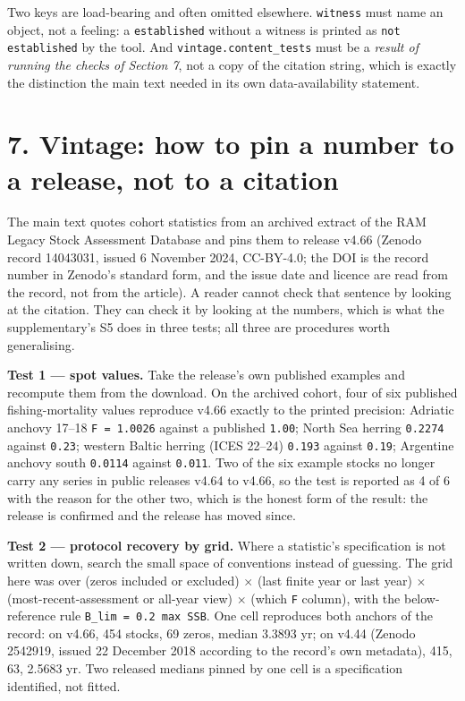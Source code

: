 \documentclass[11pt]{article}
\begin{document}
Two keys are load-bearing and often omitted elsewhere. \texttt{witness} must name an object, not a feeling: a \texttt{established} without a witness is printed as \texttt{not established} by the tool. And \texttt{vintage.content\_tests} must be a \emph{result of running the checks of Section 7}, not a copy of the citation string, which is exactly the distinction the main text needed in its own data-availability statement.

\vspace{0.8em}

\section*{7. Vintage: how to pin a number to a release, not to a citation}\label{7-vintage-how-to-pin-a-number-to-a-release-not-to-a-citation}

The main text quotes cohort statistics from an archived extract of the RAM Legacy Stock Assessment Database and pins them to release v4.66 (Zenodo record 14043031, issued 6 November 2024, CC-BY-4.0; the DOI is the record number in Zenodo's standard form, and the issue date and licence are read from the record, not from the article). A reader cannot check that sentence by looking at the citation. They can check it by looking at the numbers, which is what the supplementary's S5 does in three tests; all three are procedures worth generalising.

\textbf{Test 1 --- spot values.} Take the release's own published examples and recompute them from the download. On the archived cohort, four of six published fishing-mortality values reproduce v4.66 exactly to the printed precision: Adriatic anchovy 17--18 \texttt{F = 1.0026} against a published \texttt{1.00}; North Sea herring \texttt{0.2274} against \texttt{0.23}; western Baltic herring (ICES 22--24) \texttt{0.193} against \texttt{0.19}; Argentine anchovy south \texttt{0.0114} against \texttt{0.011}. Two of the six example stocks no longer carry any series in public releases v4.64 to v4.66, so the test is reported as 4 of 6 with the reason for the other two, which is the honest form of the result: the release is confirmed and the release has moved since.

\textbf{Test 2 --- protocol recovery by grid.} Where a statistic's specification is not written down, search the small space of conventions instead of guessing. The grid here was over (zeros included or excluded) \ensuremath{\times} (last finite year or last year) \ensuremath{\times} (most-recent-assessment or all-year view) \ensuremath{\times} (which \texttt{F} column), with the below-reference rule \texttt{B\_lim = 0.2 max SSB}. One cell reproduces both anchors of the record: on v4.66, 454 stocks, 69 zeros, median 3.3893 yr; on v4.44 (Zenodo 2542919, issued 22 December 2018 according to the record's own metadata), 415, 63, 2.5683 yr. Two released medians pinned by one cell is a specification identified, not fitted.
\end{document}
